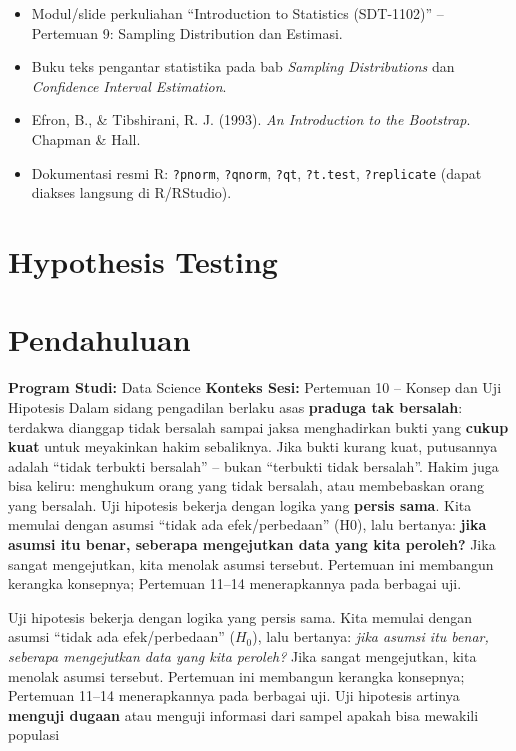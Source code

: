 \documentclass[
  indonesian,
  letterpaper,
]{book}
\providecommand{\tightlist}{%
  \setlength{\itemsep}{0pt}\setlength{\parskip}{0pt}}
\begin{document}
\begin{itemize}
\tightlist
\item
  Modul/slide perkuliahan ``Introduction to Statistics (SDT-1102)'' --
  Pertemuan 9: Sampling Distribution dan Estimasi.
\item
  Buku teks pengantar statistika pada bab \emph{Sampling Distributions}
  dan \emph{Confidence Interval Estimation}.
\item
  Efron, B., \& Tibshirani, R. J. (1993). \emph{An Introduction to the
  Bootstrap}. Chapman \& Hall.
\item
  Dokumentasi resmi R: \texttt{?pnorm}, \texttt{?qnorm}, \texttt{?qt},
  \texttt{?t.test}, \texttt{?replicate} (dapat diakses langsung di
  R/RStudio).
\end{itemize}


\chapter{Hypothesis Testing}\label{hypothesis-testing}


\chapter{Pendahuluan}\label{pendahuluan}

\textbf{Program Studi:} Data Science \textbf{Konteks Sesi:} Pertemuan 10
-- Konsep dan Uji Hipotesis Dalam sidang pengadilan berlaku asas
\textbf{praduga tak bersalah}: terdakwa dianggap tidak bersalah sampai
jaksa menghadirkan bukti yang \textbf{cukup kuat} untuk meyakinkan hakim
sebaliknya. Jika bukti kurang kuat, putusannya adalah ``tidak terbukti
bersalah'' -- bukan ``terbukti tidak bersalah''. Hakim juga bisa keliru:
menghukum orang yang tidak bersalah, atau membebaskan orang yang
bersalah. Uji hipotesis bekerja dengan logika yang \textbf{persis sama}.
Kita memulai dengan asumsi ``tidak ada efek/perbedaan'' (H0), lalu
bertanya: \textbf{jika asumsi itu benar, seberapa mengejutkan data yang
kita peroleh?} Jika sangat mengejutkan, kita menolak asumsi tersebut.
Pertemuan ini membangun kerangka konsepnya; Pertemuan 11--14
menerapkannya pada berbagai uji.

Uji hipotesis bekerja dengan logika yang persis sama. Kita memulai
dengan asumsi ``tidak ada efek/perbedaan'' (\(H_0\)), lalu bertanya:
\emph{jika asumsi itu benar, seberapa mengejutkan data yang kita
peroleh?} Jika sangat mengejutkan, kita menolak asumsi tersebut.
Pertemuan ini membangun kerangka konsepnya; Pertemuan 11--14
menerapkannya pada berbagai uji. Uji hipotesis artinya \textbf{menguji
dugaan} atau menguji informasi dari sampel apakah bisa mewakili populasi
\end{document}
